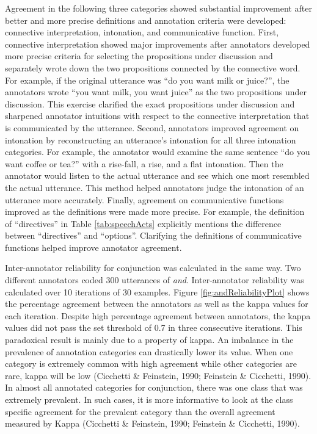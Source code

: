 \documentclass[,man,floatsintext]{apa6}
\begin{document}
Agreement in the following three categories showed substantial improvement after better and more precise definitions and annotation criteria were developed: connective interpretation, intonation, and communicative function. First, connective interpretation showed major improvements after annotators developed more precise criteria for selecting the propositions under discussion and separately wrote down the two propositions connected by the connective word. For example, if the original utterance was \enquote{do you want milk or juice?}, the annotators wrote \enquote{you want milk, you want juice} as the two propositions under discussion. This exercise clarified the exact propositions under discussion and sharpened annotator intuitions with respect to the connective interpretation that is communicated by the utterance. Second, annotators improved agreement on intonation by reconstructing an utterance's intonation for all three intonation categories. For example, the annotator would examine the same sentence \enquote{do you want coffee or tea?} with a rise-fall, a rise, and a flat intonation. Then the annotator would listen to the actual utterance and see which one most resembled the actual utterance. This method helped annotators judge the intonation of an utterance more accurately. Finally, agreement on communicative functions improved as the definitions were made more precise. For example, the definition of \enquote{directives} in Table \ref{tab:speechActs} explicitly mentions the difference between \enquote{directives} and \enquote{options}. Clarifying the definitions of communicative functions helped improve annotator agreement.

Inter-annotator reliability for conjunction was calculated in the same way. Two different annotators coded 300 utterances of \emph{and}. Inter-annotator reliability was calculated over 10 iterations of 30 examples. Figure \ref{fig:andReliabilityPlot} shows the percentage agreement between the annotators as well as the kappa values for each iteration. Despite high percentage agreement between annotators, the kappa values did not pass the set threshold of 0.7 in three consecutive iterations. This paradoxical result is mainly due to a property of kappa. An imbalance in the prevalence of annotation categories can drastically lower its value. When one category is extremely common with high agreement while other categories are rare, kappa will be low (Cicchetti \& Feinstein, 1990; Feinstein \& Cicchetti, 1990). In almost all annotated categories for conjunction, there was one class that was extremely prevalent. In such cases, it is more informative to look at the class specific agreement for the prevalent category than the overall agreement measured by Kappa (Cicchetti \& Feinstein, 1990; Feinstein \& Cicchetti, 1990).
\end{document}
